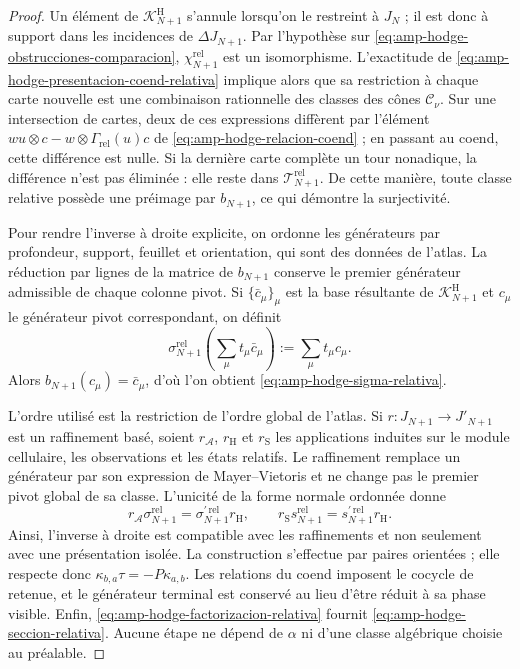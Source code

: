\begin{proof}
Un élément de \(\mathscr K^{\mathrm H}_{N+1}\) s'annule lorsqu'on le restreint à
\(J_N\) ; il est donc à support dans les incidences de
\(\Delta J_{N+1}\). Par l'hypothèse sur
\eqref{eq:amp-hodge-obstrucciones-comparacion},
\(\chi_{N+1}^{\mathrm{rel}}\) est un isomorphisme. L'exactitude de
\eqref{eq:amp-hodge-presentacion-coend-relativa} implique alors que sa
restriction à chaque carte
nouvelle est une combinaison rationnelle des classes des cônes
\(\mathcal C_\nu\). Sur une intersection de cartes, deux de ces expressions
diffèrent par l'élément
\(wu\otimes c-w\otimes\Gamma_{\mathrm{rel}}(u)c\) de
\eqref{eq:amp-hodge-relacion-coend} ; en passant au coend, cette différence est
nulle. Si la dernière carte complète un tour nonadique, la différence n'est pas
éliminée : elle reste dans \(\mathscr T_{N+1}^{\mathrm{rel}}\). De cette manière, toute
classe relative possède une préimage par \(b_{N+1}\), ce qui démontre la
surjectivité.

Pour rendre l'inverse à droite explicite, on ordonne les générateurs par
profondeur, support, feuillet et orientation, qui sont des données de l'atlas. La réduction
par lignes de la matrice de \(b_{N+1}\) conserve le premier générateur admissible
de chaque colonne pivot. Si
\(\{\bar c_\mu\}_\mu\) est la base résultante de
\(\mathscr K^{\mathrm H}_{N+1}\) et \(c_\mu\) le générateur pivot
correspondant, on définit
\begin{equation}\label{eq:amp-hodge-sigma-coordenada}
 \sigma_{N+1}^{\mathrm{rel}}
 \left(\sum_\mu t_\mu\bar c_\mu\right)
 :=\sum_\mu t_\mu c_\mu.
\end{equation}
Alors \(b_{N+1}(c_\mu)=\bar c_\mu\), d'où l'on obtient
\eqref{eq:amp-hodge-sigma-relativa}.

L'ordre utilisé est la restriction de l'ordre global de l'atlas.
Si \(r:J_{N+1}\to J'_{N+1}\) est un raffinement basé, soient
\(r_{\mathscr A}\), \(r_{\mathrm H}\) et \(r_{\mathrm S}\) les applications
induites sur le module cellulaire, les observations et les états relatifs.
Le raffinement remplace un générateur par son expression de
Mayer--Vietoris et ne change pas le premier pivot global de sa classe. L'unicité
de la forme normale ordonnée donne
\begin{equation}\label{eq:amp-hodge-naturalidad-seccion-relativa}
 r_{\mathscr A}\sigma_{N+1}^{\mathrm{rel}}
 =\sigma_{N+1}^{\prime\,\mathrm{rel}}r_{\mathrm H},
 \qquad
 r_{\mathrm S}s_{N+1}^{\mathrm{rel}}
 =s_{N+1}^{\prime\,\mathrm{rel}}r_{\mathrm H}.
\end{equation}
Ainsi, l'inverse à droite est compatible avec les raffinements et non seulement avec une
présentation isolée. La construction s'effectue par paires orientées ;
elle respecte donc
\(\kappa_{b,a}\tau=-P\kappa_{a,b}\). Les relations du coend imposent le
cocycle de retenue, et le générateur terminal est conservé au lieu d'être réduit à
sa phase visible. Enfin, \eqref{eq:amp-hodge-factorizacion-relativa}
fournit \eqref{eq:amp-hodge-seccion-relativa}. Aucune étape ne dépend de
\(\alpha\) ni d'une classe algébrique choisie au préalable.
\end{proof}

